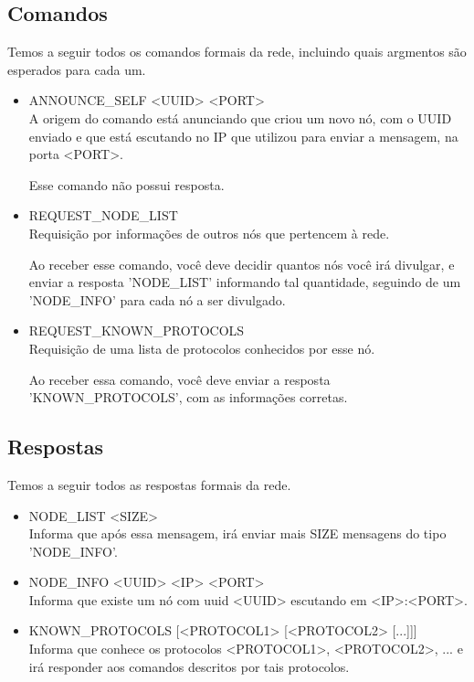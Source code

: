    \subsection{Comandos}
      Temos a seguir todos os comandos formais da rede, incluindo quais argmentos são esperados para cada um.
        
      \begin{itemize}
        \item ANNOUNCE\_SELF <UUID> <PORT> \\
          A origem do comando está anunciando que criou um novo nó, com o UUID enviado e que está escutando
          no IP que utilizou para enviar a mensagem, na porta <PORT>.
          
          Esse comando não possui resposta.
      
        \item REQUEST\_NODE\_LIST \\
          Requisição por informações de outros nós que pertencem à rede.
          
          Ao receber esse comando, você deve decidir quantos nós você irá divulgar, e enviar a resposta
          'NODE\_LIST' informando tal quantidade, seguindo de um 'NODE\_INFO' para cada nó a ser
          divulgado.
          
        \item REQUEST\_KNOWN\_PROTOCOLS \\
          Requisição de uma lista de protocolos conhecidos por esse nó.
          
          Ao receber essa comando, você deve enviar a resposta 'KNOWN\_PROTOCOLS', com as informações corretas.
          
      \end{itemize}
      
    \subsection{Respostas}
      Temos a seguir todos as respostas formais da rede.
      
      \begin{itemize}
        \item NODE\_LIST <SIZE> \\
          Informa que após essa mensagem, irá enviar mais SIZE mensagens do tipo 'NODE\_INFO'.
          
        \item NODE\_INFO <UUID> <IP> <PORT> \\
          Informa que existe um nó com uuid <UUID> escutando em <IP>:<PORT>.
          
        \item KNOWN\_PROTOCOLS [<PROTOCOL1> [<PROTOCOL2> [...]]] \\
          Informa que conhece os protocolos <PROTOCOL1>, <PROTOCOL2>, ... e irá responder aos
          comandos descritos por tais protocolos.
      
      \end{itemize}
      
